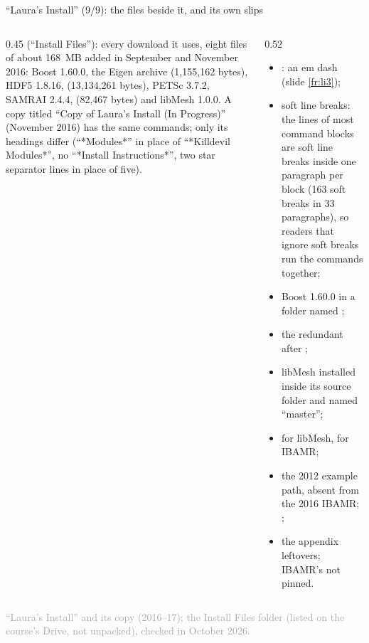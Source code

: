 \documentclass[aspectratio=169,11pt]{beamer}
\newcommand{\sourcecredit}[1]{\vfill\begin{flushright}\tiny\textcolor{DarkGray}{#1}\end{flushright}}
\newcommand{\emdashmark}{\textcolor{RubineRed}{\rmfamily\textemdash}}
\begin{document}
\begin{frame}{``Laura's Install'' (9/9): the files beside it, and its own slips}
\label{fr:lifiles}
\begin{columns}[T,onlytextwidth]
\begin{column}{0.45\textwidth}
\footnotesize {} (``Install Files''): every download it uses, eight files of about 168~MB added in September and November 2016: Boost 1.60.0, the Eigen archive  (1{,}155{,}162 bytes), HDF5 1.8.16,  (13{,}134{,}261 bytes), PETSc 3.7.2, SAMRAI 2.4.4,  (82{,}467 bytes) and libMesh 1.0.0.
\vspace{1mm}
A copy titled ``Copy of Laura's Install (In Progress)'' (November 2016) has the same commands; only its headings differ (``*Modules*'' in place of ``*Killdevil Modules*'', no ``*Install Instructions*'', two star separator lines in place of five).
\end{column}
\begin{column}{0.52\textwidth}
\footnotesize {}
\begin{itemize}\setlength{\itemsep}{2pt}
  \item \code{\emdashmark{}-with-hypre=1}: an em dash (slide \ref{fr:li3});
  \item soft line breaks: the lines of most command blocks are soft line breaks inside one paragraph per block (163 soft breaks in 33 paragraphs), so readers that ignore soft breaks run the commands together;
  \item Boost 1.60.0 in a folder named ;
  \item the redundant  after ;
  \item libMesh installed inside its source folder and named ``master'';
  \item {} for libMesh,  for IBAMR;
  \item the 2012 example path, absent from the 2016 IBAMR; ;
  \item the appendix leftovers; IBAMR's  not pinned.
\end{itemize}
\end{column}
\end{columns}
\sourcecredit{``Laura's Install'' and its copy (2016--17); the Install Files folder (listed on the course's Drive, not unpacked), checked in October 2026.}
\end{frame}
\end{document}
